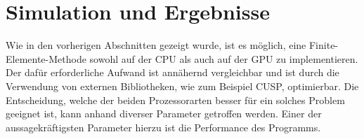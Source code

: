 \documentclass{article}
\begin{document}
  \section{Simulation und Ergebnisse} %
  \label{sec:simulation_und_ergebnisse}

    Wie in den vorherigen Abschnitten gezeigt wurde, ist es möglich, eine Finite-Elemente-Methode sowohl auf der CPU als auch auf der GPU zu implementieren.
    Der dafür erforderliche Aufwand ist annähernd vergleichbar und ist durch die Verwendung von externen Bibliotheken, wie zum Beispiel CUSP, optimierbar.
    Die Entscheidung, welche der beiden Prozessorarten besser für ein solches Problem geeignet ist, kann anhand diverser Parameter getroffen werden.
    Einer der aussagekräftigsten Parameter hierzu ist die Performance des Programms.
\end{document}
